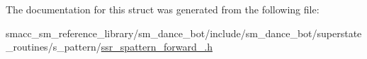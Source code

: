 The documentation for this struct was generated from the following file\+:\begin{DoxyCompactItemize}
\item 
smacc\+\_\+sm\+\_\+reference\+\_\+library/sm\+\_\+dance\+\_\+bot/include/sm\+\_\+dance\+\_\+bot/superstate\+\_\+routines/s\+\_\+pattern/\hyperlink{ssr__spattern__forward__4_8h}{ssr\+\_\+spattern\+\_\+forward\+\_.\+h}\end{DoxyCompactItemize}
